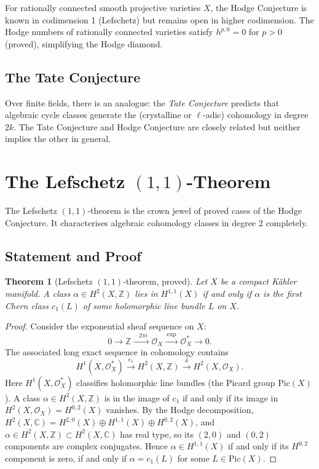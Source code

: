 \documentclass[12pt,a4paper]{amsart}
\newtheorem{theorem}{Theorem}[section]
\theoremstyle{definition}
\theoremstyle{remark}
\begin{document}
For rationally connected smooth projective varieties $X$, the Hodge Conjecture is
known in codimension 1 (Lefschetz) but remains open in higher codimension. The
Hodge numbers of rationally connected varieties satisfy $h^{p,0} = 0$ for $p > 0$
(proved), simplifying the Hodge diamond.

\subsection{The Tate Conjecture}

Over finite fields, there is an analogue: the \emph{Tate Conjecture} predicts that
algebraic cycle classes generate the (crystalline or $\ell$-adic) cohomology in
degree $2k$. The Tate Conjecture and Hodge Conjecture are closely related but
neither implies the other in general.

\section{The Lefschetz \texorpdfstring{$(1,1)$}{(1,1)}-Theorem}
\label{sec:lefschetz}

The Lefschetz $(1,1)$-theorem is the crown jewel of proved cases of the Hodge
Conjecture. It characterises algebraic cohomology classes in degree 2 completely.

\subsection{Statement and Proof}

\begin{theorem}[Lefschetz $(1,1)$-theorem, proved]
\label{thm:lefschetz11}
Let $X$ be a compact Kähler manifold. A class $\alpha \in H^2(X, \mathbb{Z})$
lies in $H^{1,1}(X)$ if and only if $\alpha$ is the first Chern class $c_1(L)$
of some holomorphic line bundle $L$ on $X$.
\end{theorem}

\begin{proof}[Proof]
Consider the exponential sheaf sequence on $X$:
\[
  0 \longrightarrow \mathbb{Z} \xrightarrow{\;\cdot 2\pi i\;}
  \mathcal{O}_X \xrightarrow{\;\exp\;} \mathcal{O}_X^* \longrightarrow 0.
\]
The associated long exact sequence in cohomology contains
\[
  H^1(X, \mathcal{O}_X^*) \xrightarrow{\;c_1\;} H^2(X, \mathbb{Z})
  \xrightarrow{\;\delta\;} H^2(X, \mathcal{O}_X).
\]
Here $H^1(X, \mathcal{O}_X^*)$ classifies holomorphic line bundles (the Picard
group $\mathrm{Pic}(X)$). A class $\alpha \in H^2(X,\mathbb{Z})$ is in the image
of $c_1$ if and only if its image in $H^2(X, \mathcal{O}_X) = H^{0,2}(X)$ vanishes.
By the Hodge decomposition, $H^2(X,\mathbb{C}) = H^{2,0}(X) \oplus H^{1,1}(X)
\oplus H^{0,2}(X)$, and $\alpha \in H^2(X,\mathbb{Z}) \subset H^2(X,\mathbb{C})$
has real type, so its $(2,0)$ and $(0,2)$ components are complex conjugates. Hence
$\alpha \in H^{1,1}(X)$ if and only if its $H^{0,2}$ component is zero, if and
only if $\alpha = c_1(L)$ for some $L \in \mathrm{Pic}(X)$.
\end{proof}
\end{document}
